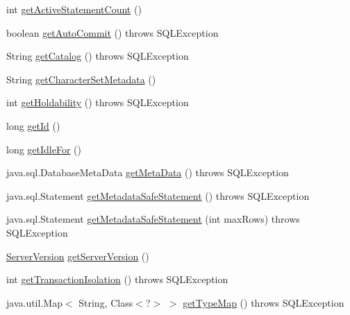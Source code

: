 \begin{DoxyCompactItemize}
\item 
int \mbox{\hyperlink{classcom_1_1mysql_1_1cj_1_1jdbc_1_1_connection_impl_a858f89a9745e2ffc3e748c91286d7862}{get\+Active\+Statement\+Count}} ()
\item 
boolean \mbox{\hyperlink{classcom_1_1mysql_1_1cj_1_1jdbc_1_1_connection_impl_a9c1ff3f925f011a393add7da7dae1871}{get\+Auto\+Commit}} ()  throws S\+Q\+L\+Exception 
\item 
String \mbox{\hyperlink{classcom_1_1mysql_1_1cj_1_1jdbc_1_1_connection_impl_a0873bb4479be9327023a37eaace6b45f}{get\+Catalog}} ()  throws S\+Q\+L\+Exception 
\item 
String \mbox{\hyperlink{classcom_1_1mysql_1_1cj_1_1jdbc_1_1_connection_impl_ac1333e56c524a3b5436c575ee82b0c18}{get\+Character\+Set\+Metadata}} ()
\item 
int \mbox{\hyperlink{classcom_1_1mysql_1_1cj_1_1jdbc_1_1_connection_impl_ad99dbc456dfcebbb7fc11f100893ca56}{get\+Holdability}} ()  throws S\+Q\+L\+Exception 
\item 
long \mbox{\hyperlink{classcom_1_1mysql_1_1cj_1_1jdbc_1_1_connection_impl_ae835f7c80a3c9705b622a244ba07e7e3}{get\+Id}} ()
\item 
long \mbox{\hyperlink{classcom_1_1mysql_1_1cj_1_1jdbc_1_1_connection_impl_a628961d1155b35d0582a3198c2a6bb83}{get\+Idle\+For}} ()
\item 
java.\+sql.\+Database\+Meta\+Data \mbox{\hyperlink{classcom_1_1mysql_1_1cj_1_1jdbc_1_1_connection_impl_acece4c22f0678d1b70d487c8658f1d49}{get\+Meta\+Data}} ()  throws S\+Q\+L\+Exception 
\item 
java.\+sql.\+Statement \mbox{\hyperlink{classcom_1_1mysql_1_1cj_1_1jdbc_1_1_connection_impl_a66f6e72ea3c8a1db920f4fe5f736b4c9}{get\+Metadata\+Safe\+Statement}} ()  throws S\+Q\+L\+Exception 
\item 
java.\+sql.\+Statement \mbox{\hyperlink{classcom_1_1mysql_1_1cj_1_1jdbc_1_1_connection_impl_ae2f79574cde7e93df85c06f092230bc8}{get\+Metadata\+Safe\+Statement}} (int max\+Rows)  throws S\+Q\+L\+Exception 
\item 
\mbox{\hyperlink{classcom_1_1mysql_1_1cj_1_1_server_version}{Server\+Version}} \mbox{\hyperlink{classcom_1_1mysql_1_1cj_1_1jdbc_1_1_connection_impl_a9267b762c7ea6995bef16e7fa28a8eaf}{get\+Server\+Version}} ()
\item 
int \mbox{\hyperlink{classcom_1_1mysql_1_1cj_1_1jdbc_1_1_connection_impl_aa92a66e7ffd147ccf70a80fb47601760}{get\+Transaction\+Isolation}} ()  throws S\+Q\+L\+Exception 
\item 
java.\+util.\+Map$<$ String, Class$<$?$>$ $>$ \mbox{\hyperlink{classcom_1_1mysql_1_1cj_1_1jdbc_1_1_connection_impl_a9960d23d0f9d8c6990c184e0a3e3630c}{get\+Type\+Map}} ()  throws S\+Q\+L\+Exception 

\end{DoxyCompactItemize}
